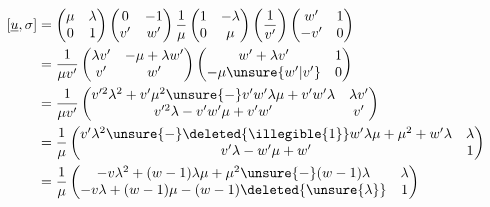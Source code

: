 
\[
\begin{aligned}
{}[\underline u,\sigma]
&=\begin{pmatrix}\mu&\lambda\\0&1\end{pmatrix}
\begin{pmatrix}0&-1\\v'&w'\end{pmatrix}
\frac1\mu\begin{pmatrix}1&-\lambda\\0&\mu\end{pmatrix}
\left(\frac1{v'}\right)\begin{pmatrix}w'&1\\-v'&0\end{pmatrix}\\
&=\frac1{\mu v'}\begin{pmatrix}\lambda v'&-\mu+\lambda w'\\v'&w'\end{pmatrix}
\begin{pmatrix}w'+\lambda v'&1\\-\mu\unsure{w'|v'}&0\end{pmatrix}\\
&=\frac1{\mu v'}\begin{pmatrix}
v'^2\lambda^2+v'\mu^2\unsure{-}v'w'\lambda\mu+v'w'\lambda&\lambda v'\\
v'^2\lambda-v'w'\mu+v'w'&v'
\end{pmatrix}\\
&=\frac1\mu\begin{pmatrix}
v'\lambda^2\unsure{-}\deleted{\illegible{1}}w'\lambda\mu+\mu^2+w'\lambda&\lambda\\
v'\lambda-w'\mu+w'&1
\end{pmatrix}\\
&=\frac1\mu\begin{pmatrix}
-v\lambda^2+(w-1)\lambda\mu+\mu^2\unsure{-}(w-1)\lambda&\lambda\\
-v\lambda+(w-1)\mu-(w-1)\deleted{\unsure{\lambda}}&1
\end{pmatrix}
\end{aligned}
\]

